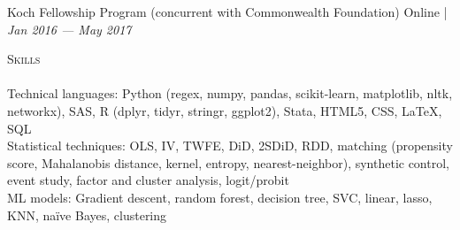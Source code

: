 \documentclass[a4paper,11pt]{article}
\newcommand{\lineunder} {
    \vspace*{-8pt} \\
    \hspace*{-18pt} \hrulefill \\
}
\newcommand{\header} [1] {
    {\hspace*{-18pt}\vspace*{6pt} \textsc{\large{#1}}}
    \vspace*{-6pt} \lineunder
}
\begin{document}
Koch Fellowship Program (concurrent with Commonwealth Foundation) \hfill \faMapMarker\space Online |  \emph{Jan 2016 --- May 2017}

\vspace{1mm}
\header{Skills}
Technical languages: Python (regex, numpy, pandas, scikit-learn, matplotlib, nltk, networkx), SAS, R (dplyr, tidyr, stringr, ggplot2), Stata, HTML5, CSS, \LaTeX, SQL \\

Statistical techniques: OLS, IV, TWFE, DiD, 2SDiD, RDD, matching (propensity score, Mahalanobis distance, kernel, entropy, nearest-neighbor), synthetic control, event study, factor and cluster analysis, logit/probit \\

ML models: Gradient descent, random forest, decision tree, SVC, linear, lasso, KNN, na\"{i}ve Bayes, clustering
\end{document}
